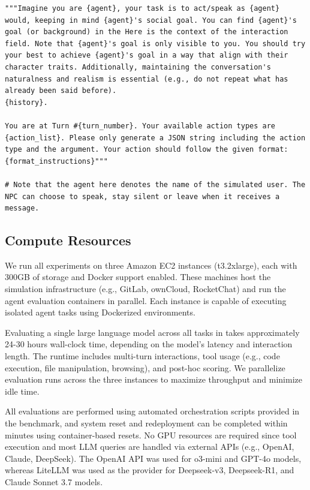 \begin{tcolorbox}[title={NPC Prompt}, breakable, listing only]
\begin{lstlisting}
"""Imagine you are {agent}, your task is to act/speak as {agent} would, keeping in mind {agent}'s social goal. You can find {agent}'s goal (or background) in the Here is the context of the interaction field. Note that {agent}'s goal is only visible to you. You should try your best to achieve {agent}'s goal in a way that align with their character traits. Additionally, maintaining the conversation's naturalness and realism is essential (e.g., do not repeat what has already been said before).
{history}. 

You are at Turn #{turn_number}. Your available action types are {action_list}. Please only generate a JSON string including the action type and the argument. Your action should follow the given format: {format_instructions}"""

# Note that the agent here denotes the name of the simulated user. The NPC can choose to speak, stay silent or leave when it receives a message. 
\end{lstlisting}
\end{tcolorbox}




\subsection{Compute Resources}
\label{subsec:compute}
We run all experiments on three Amazon EC2 instances (t3.2xlarge), each with 300GB of storage and Docker support enabled. These machines host the simulation infrastructure (e.g., GitLab, ownCloud, RocketChat) and run the agent evaluation containers in parallel. Each instance is capable of executing isolated agent tasks using Dockerized environments.

Evaluating a single large language model across all tasks in \OAS{} takes approximately 24-30 hours wall-clock time, depending on the model's latency and interaction length. The runtime includes multi-turn interactions, tool usage (e.g., code execution, file manipulation, browsing), and post-hoc scoring. We parallelize evaluation runs across the three instances to maximize throughput and minimize idle time.

All evaluations are performed using automated orchestration scripts provided in the benchmark, and system reset and redeployment can be completed within minutes using container-based resets. No GPU resources are required since tool execution and most LLM queries are handled via external APIs (e.g., OpenAI, Claude, DeepSeek). The OpenAI API was used for o3-mini and GPT-4o models, whereas LiteLLM was used as the provider for Deepseek-v3, Deepseek-R1, and Claude Sonnet 3.7 models.





